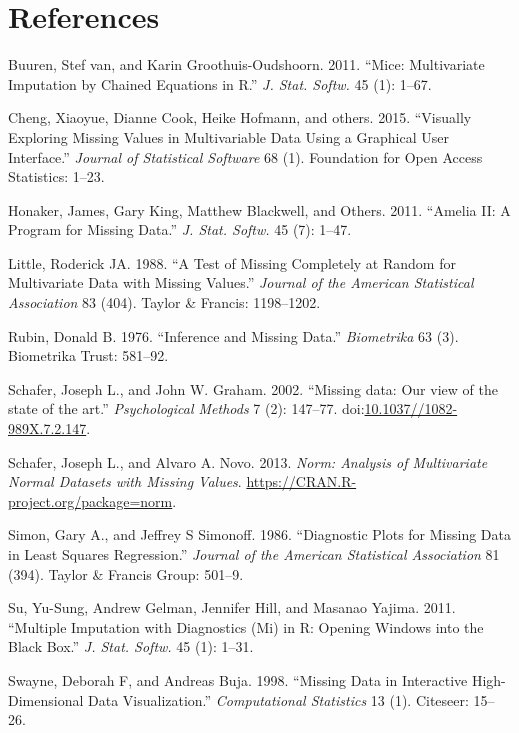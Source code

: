 \documentclass[]{article}
\begin{document}
\section*{References}\label{references}

\hypertarget{refs}{}
\hypertarget{ref-mice}{}
Buuren, Stef van, and Karin Groothuis-Oudshoorn. 2011. ``Mice:
Multivariate Imputation by Chained Equations in R.'' \emph{J. Stat.
Softw.} 45 (1): 1--67.

\hypertarget{ref-cheng2015}{}
Cheng, Xiaoyue, Dianne Cook, Heike Hofmann, and others. 2015. ``Visually
Exploring Missing Values in Multivariable Data Using a Graphical User
Interface.'' \emph{Journal of Statistical Software} 68 (1). Foundation
for Open Access Statistics: 1--23.

\hypertarget{ref-Amelia}{}
Honaker, James, Gary King, Matthew Blackwell, and Others. 2011. ``Amelia
II: A Program for Missing Data.'' \emph{J. Stat. Softw.} 45 (7): 1--47.

\hypertarget{ref-Little1988}{}
Little, Roderick JA. 1988. ``A Test of Missing Completely at Random for
Multivariate Data with Missing Values.'' \emph{Journal of the American
Statistical Association} 83 (404). Taylor \& Francis: 1198--1202.

\hypertarget{ref-Rubin1976}{}
Rubin, Donald B. 1976. ``Inference and Missing Data.'' \emph{Biometrika}
63 (3). Biometrika Trust: 581--92.

\hypertarget{ref-Schafer2002}{}
Schafer, Joseph L., and John W. Graham. 2002. ``Missing data: Our view
of the state of the art.'' \emph{Psychological Methods} 7 (2): 147--77.
doi:\href{https://doi.org/10.1037//1082-989X.7.2.147}{10.1037//1082-989X.7.2.147}.

\hypertarget{ref-norm}{}
Schafer, Joseph L., and Alvaro A. Novo. 2013. \emph{Norm: Analysis of
Multivariate Normal Datasets with Missing Values}.
\url{https://CRAN.R-project.org/package=norm}.

\hypertarget{ref-simon-simonoff}{}
Simon, Gary A., and Jeffrey S Simonoff. 1986. ``Diagnostic Plots for
Missing Data in Least Squares Regression.'' \emph{Journal of the
American Statistical Association} 81 (394). Taylor \& Francis Group:
501--9.

\hypertarget{ref-mi}{}
Su, Yu-Sung, Andrew Gelman, Jennifer Hill, and Masanao Yajima. 2011.
``Multiple Imputation with Diagnostics (Mi) in R: Opening Windows into
the Black Box.'' \emph{J. Stat. Softw.} 45 (1): 1--31.

\hypertarget{ref-Swayne1998}{}
Swayne, Deborah F, and Andreas Buja. 1998. ``Missing Data in Interactive
High-Dimensional Data Visualization.'' \emph{Computational Statistics}
13 (1). Citeseer: 15--26.
\end{document}
